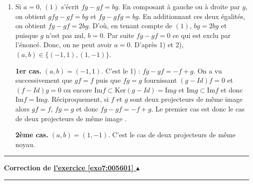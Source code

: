 \documentclass[11pt,a4paper]{article}
\newcounter{exo}
\newcommand{\correction}[1]{\hypertarget{cor7:#1}{}\label{cor7:#1}{\bf Correction de \hyperlink{exo7:#1}{l'exercice \ref{exo7:#1} $\blacktriangle$}}\vspace{1mm}\hrule\vspace{1mm}}
\newcommand{\fincorrection}{\vspace{1mm}\hrule\vspace*{7mm}}
\begin{document}
\begin{enumerate}
\item  Si $a = 0$, $(1)$ s'écrit $fg - gf = bg$. En composant à gauche ou à droite par $g$, on obtient $gfg - gf = bg$ et $fg - gfg = bg$. En additionnant ces deux égalités, on obtient $fg - gf = 2bg$. D'où, en tenant compte de $(1)$, $bg = 2bg$ et puisque $g$ n'est pas nul, $b = 0$. Par suite $fg - gf = 0$ ce qui est exclu par l'énoncé. Donc, on ne peut avoir $a = 0$. D'après 1) et 2), $(a,b)\in\{(-1,1),(1,-1)\}$.

\textbf{1er cas.} $(a,b) = (-1,1)$. C'est le 1) : $fg - gf = -f +g$. On a vu successivement que $gf = f$  puis que $fg = g$ fournissant $(g-Id)f = 0$ et $(f-Id)g = 0$ ou encore 
$\text{Im}f \subset\text{Ker}(g-Id) =\text{Im}g$ et $\text{Im}g \subset\text{Im}f$ et donc $\text{Im}f =\text{Im}g$. Réciproquement, si $f$ et $g$ sont deux projecteurs de même image alors $gf = f$, $fg = g$ et donc $fg - gf = -f + g$. Le premier cas est donc le cas de deux projecteurs de même image .

\textbf{2ème cas.} $(a,b) = (1,-1)$. C'est le cas de deux projecteurs de même noyau.
\end{enumerate}
\fincorrection
\correction{005601}
\end{document}
